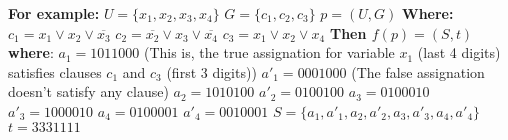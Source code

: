 \textbf{For example:}
\newline
$U=\{x_1, x_2, x_3, x_4\}$\newline
$G=\{c_1, c_2, c_3\}$\newline
$p=(U, G)$\newline
\textbf{Where:}\newline
$c_1 = x_1 \vee x_2 \vee \overline{x_3}$\newline
$c_2 = \overline{x_2} \vee x_3 \vee \overline{x_4}$\newline
$c_3 = x_1 \vee x_2 \vee x_4$\newline
\textbf{Then $f(p)=(S, t)$ where}:\newline
$a_1 = 1011000$ (This is, the true assignation for variable $x_1$ (last 4 digits) satisfies clauses $c_1$ and $c_3$ (first 3 digits))\newline
$a'_1 = 0001000$ (The false assignation doesn't satisfy any clause)\newline
$a_2 = 1010100$\newline
$a'_2 = 0100100$\newline
$a_3 = 0100010$\newline
$a'_3 = 1000010$\newline
$a_4 = 0100001$\newline
$a'_4 = 0010001$\newline
$S=\{a_1, a'_1, a_2, a'_2, a_3, a'_3, a_4, a'_4 \}$\newline
$t=3331111$\newline
